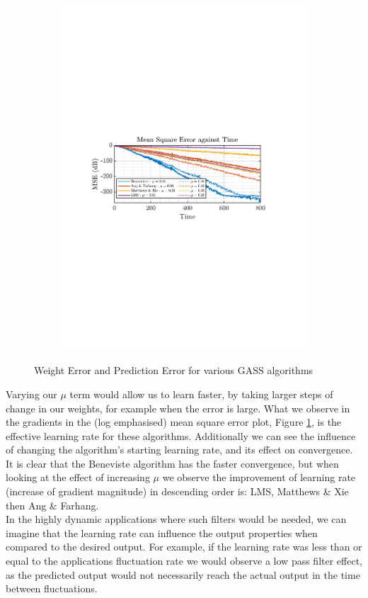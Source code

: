 \documentclass[12pt]{article}
\numberwithin{equation}{section}
\begin{document}
\begin{figure}[H]
\begin{subfigure}{0.49\textwidth}
					\centering
					\includegraphics[trim={2.2cm 11.2cm 3.15cm  11.2cm}, clip, width=\textwidth]{../MATLAB/figures/q2_2a_fig04.pdf} 
					\captionsetup{justification=centering}
				\end{subfigure}
				\captionsetup{justification=centering}
				\caption{Weight Error and Prediction Error for various GASS algorithms}
				\label{fig: 2-2a}
			\end{figure}
		Varying our $\mu$ term would allow us to learn faster, by taking larger steps of change in our weights, for example when the error is large. What we observe in the gradients in the (log emphasised) mean square error plot, Figure \ref{fig: 2-2a}, is the effective learning rate for these algorithms. Additionally we can see the influence of changing the algorithm's starting learning rate, and its effect on convergence. It is clear that the Beneviste algorithm has the faster convergence, but when looking at the effect of increasing $\mu$ we observe the improvement of learning rate (increase of gradient magnitude) in descending order is: LMS, Matthews \& Xie then Ang \& Farhang.\\
		In the highly dynamic applications where such filters would be needed, we can imagine that the learning rate can influence the output properties when compared to the desired output. For example, if the learning rate was less than or equal to the applications fluctuation rate we would observe a low pass filter effect, as the predicted output would not necessarily reach the actual output in the time between fluctuations.
		
\end{document}
